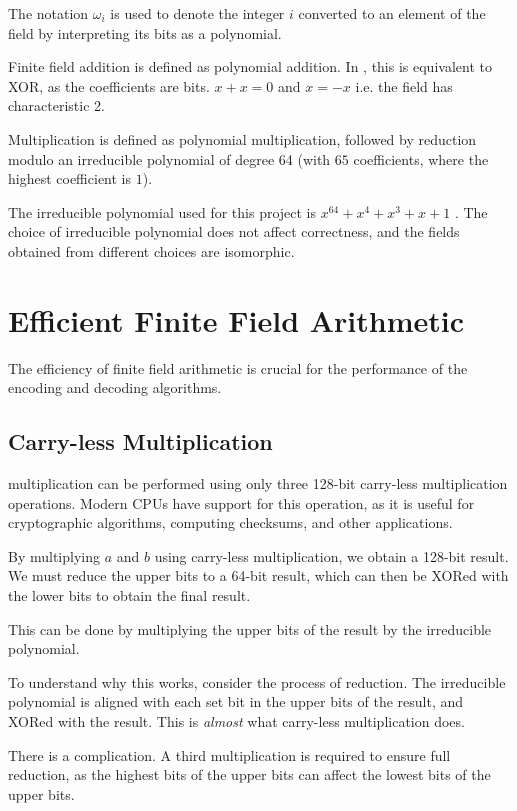 The notation $\omega_i$ is used to denote the integer $i$ converted to an element of the field  by interpreting its bits as a polynomial.

Finite field addition is defined as polynomial addition.
In , this is equivalent to XOR, as the coefficients are bits. $x + x = 0$ and $x = -x$ i.e. the field has characteristic 2.

Multiplication is defined as polynomial multiplication, followed by reduction modulo an irreducible polynomial of degree 64 (with $65$ coefficients, where the highest coefficient is $1$).

The irreducible polynomial used for this project is $x^{64} + x^4 + x^3 + x + 1$ \cite{low-weight-polynomials}.
The choice of irreducible polynomial does not affect correctness, and the fields obtained from different choices are isomorphic.

\section{Efficient Finite Field Arithmetic}

The efficiency of finite field arithmetic is crucial for the performance of the encoding and decoding algorithms.

\subsection{Carry-less Multiplication}

 multiplication can be performed using only three 128-bit carry-less multiplication operations.
Modern CPUs have support for this operation, as it is useful for cryptographic algorithms, computing checksums, and other applications. \cite{intel-clmul}

By multiplying $a$ and $b$ using carry-less multiplication, we obtain a 128-bit result.
We must reduce the upper bits to a 64-bit result, which can then be XORed with the lower bits to obtain the final result.

This can be done by multiplying the upper bits of the result by the irreducible polynomial.

To understand why this works, consider the process of reduction.
The irreducible polynomial is aligned with each set bit in the upper bits of the result, and XORed with the result.
This is \textit{almost} what carry-less multiplication does.

There is a complication.
A third multiplication is required to ensure full reduction, as the highest bits of the upper bits can affect the lowest bits of the upper bits.

